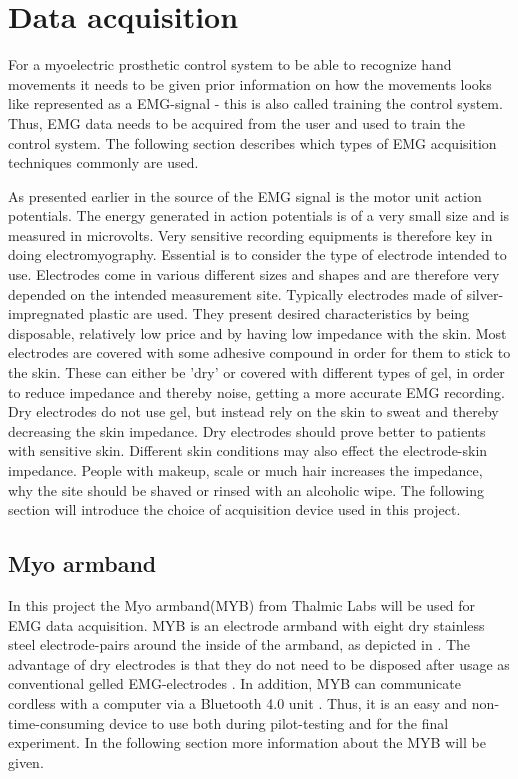 \section{Data acquisition} \label{sec:MYB}
For a myoelectric prosthetic control system to be able to recognize hand movements it needs to be given prior information on how the movements looks like represented as a EMG-signal - this is also called training the control system. Thus, EMG data needs to be acquired from the user and used to train the control system. The following section describes which types of EMG acquisition techniques commonly are used.

As presented earlier in  the source of the EMG signal is the motor unit action potentials. The energy generated in action potentials is of a very small size and is measured in microvolts. Very sensitive recording equipments is therefore key in doing electromyography. Essential is to consider the type of electrode intended to use. Electrodes come in various different sizes and shapes and are therefore very depended on the intended measurement site. Typically electrodes made of silver-impregnated plastic are used. They present desired characteristics by being disposable, relatively low price and by having low impedance with the skin. Most electrodes are covered with some adhesive compound in order for them to stick to the skin. These can either be 'dry' or covered with different types of gel, in order to reduce impedance and thereby noise, getting a more accurate EMG recording. Dry electrodes do not use gel, but instead rely on the skin to sweat and thereby decreasing the skin impedance. Dry electrodes should prove better to patients with sensitive skin. Different skin conditions may also effect the electrode-skin impedance. People with makeup, scale or much hair increases the impedance, why the site should be shaved or rinsed with an alcoholic wipe.\cite{Cram2012} The following section will introduce the choice of acquisition device used in this project.

\subsection{Myo armband}
In this project the Myo armband(MYB) from Thalmic Labs will be used for EMG data acquisition. MYB is an electrode armband with eight dry stainless steel electrode-pairs around the inside of the armband, as depicted in . The advantage of dry electrodes is that they do not need to be disposed after usage as conventional gelled EMG-electrodes \cite{Cram2012}. In addition, MYB can communicate cordless with a computer via a Bluetooth 4.0 unit \cite{Myoarmband2013}. Thus, it is an easy and non-time-consuming device to use both during pilot-testing and for the final experiment. In the following section more information about the MYB will be given.

